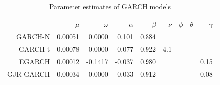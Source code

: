 \begin{table}[ht]
\centering
\begin{tabular}{rrrrrrrrr}
  \hline
\hline
 & $\mu$ & $\omega$ & $\alpha$ & $\beta$ & $\nu$ & $\phi$ & $\theta$ & $\gamma$ \\ 
  \hline
GARCH-N & 0.00051 & 0.0000 & 0.101 & 0.884 &  &  &  &  \\ 
  GARCH-t & 0.00078 & 0.0000 & 0.077 & 0.922 & 4.1 &  &  &  \\ 
  EGARCH & 0.00012 & -0.1417 & -0.037 & 0.980 &  &  &  & 0.15 \\ 
  GJR-GARCH & 0.00034 & 0.0000 & 0.033 & 0.912 &  &  &  & 0.08 \\ 
   \hline
\hline
\end{tabular}
\caption{Parameter estimates of GARCH models} 
\label{ORCL}
\end{table}

